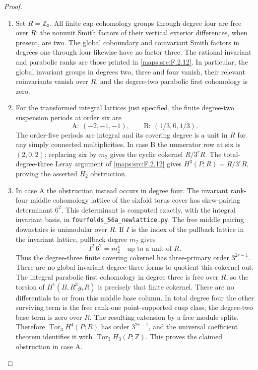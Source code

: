 \documentclass[11pt,a4paper]{article}
\theoremstyle{definition}
\begin{document}
\begin{proof}
\begin{enumerate}[label=\arabic*.]
\item Set $R=\mathbb Z_3$.  All finite cap cohomology groups
through degree four are free over $R$: the nonunit Smith
factors of their vertical exterior differences, when
present, are two.  The global coboundary and coinvariant
Smith factors in degrees one through four likewise have
no factor three.  The rational invariant and parabolic
ranks are those printed in \ref{maps:src:F.2.12}.  In particular,
the global invariant groups in degrees two, three and
four vanish, their relevant coinvariants vanish over $R$,
and the degree-two parabolic first cohomology is zero.

\item For the transformed integral lattices just specified, the
finite degree-two suspension periods at order six are
\[
 \mathrm A:\ (-2,-1,-1),\qquad
 \mathrm B:\ (1/3,0,1/3).
 \tag{F.37}\label{maps:eq:F.37}
\]
The order-five periods are integral and its covering degree
is a unit in $R$ for any simply connected multiplicities.
In case B the numerator row at six is $(2,0,2)$; replacing
six by $m_2$ gives the cyclic cokernel $R/3^rR$.
The total-degree-three Leray argument of \ref{maps:src:F.2.12} gives
$H^3(P;R)=R/3^rR$, proving the asserted $H_2$ obstruction.

\item In case A the obstruction instead occurs in degree four.
The invariant rank-four middle cohomology lattice of the
sixfold torus cover has skew-pairing determinant $6^2$.
This determinant is computed exactly, with the integral
invariant basis, in \texttt{fourfolds\_56a\_newlattice.py}.
The free middle pairing downstairs is unimodular over $R$.
If $I$ is the index of the pullback lattice in the invariant
lattice, pullback degree $m_2$ gives
\[
 I^2\,6^2=m_2^4
 \quad\text{up to a unit of }R.
 \tag{F.38}\label{maps:eq:F.38}
\]
Thus the degree-three finite covering cokernel has
three-primary order $3^{2r-1}$.
There are no global invariant degree-three forms to
quotient this cokernel out.  The integral parabolic first
cohomology in degree three is free over $R$, so the torsion
of $H^1(B,R^3g_*R)$ is precisely that finite cokernel.
There are no differentials to or from this middle base
column.  In total degree four the other surviving term
is the free rank-one point-supported cusp class;
the degree-two base term is zero over $R$.
The resulting extension by a free module splits.
Therefore $\operatorname{Tor}_3H^4(P;R)$ has order
$3^{2r-1}$, and the universal coefficient theorem identifies
it with $\operatorname{Tor}_3H_3(P;\mathbb Z)$.
This proves the claimed obstruction in case A.

\end{enumerate}
\end{proof}
\end{document}
